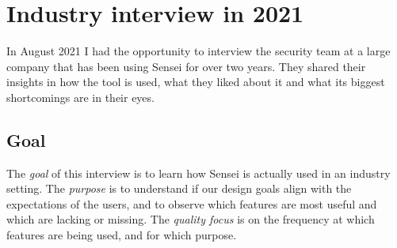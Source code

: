 \section{Industry interview in 2021}
\label{sec:trial}

%    
%    
%    
%    

In August 2021 I had the opportunity to interview the security team at a large company that has been using Sensei for over two years.
They shared their insights in how the tool is used, what they liked about it and what its biggest shortcomings are in their eyes. 
        
\subsection{Goal}
The \textit{goal} of this interview is to learn how Sensei is actually used in an industry setting.
The \textit{purpose} is to understand if our design goals align with the expectations of the users, and to observe which features are most useful and which are lacking or missing.
The \textit{quality focus} is on the frequency at which features are being used, and for which purpose.

